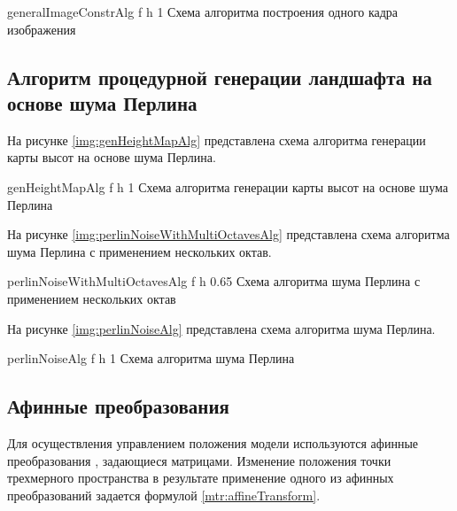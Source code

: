 {generalImageConstrAlg} %
{f} %
{h} %
{1\textwidth} %
{Схема алгоритма построения одного кадра изображения} %

\clearpage

\subsection{Алгоритм процедурной генерации ландшафта на основе шума Перлина}

На рисунке \ref{img:genHeightMapAlg} представлена схема алгоритма генерации карты высот на основе шума Перлина.

{genHeightMapAlg} %
{f} %
{h} %
{1\textwidth} %
{Схема алгоритма генерации карты высот на основе шума Перлина} %

\clearpage

На рисунке \ref{img:perlinNoiseWithMultiOctavesAlg} представлена схема алгоритма шума Перлина с применением нескольких октав.

{perlinNoiseWithMultiOctavesAlg} %
{f} %
{h} %
{0.65\textwidth} %
{Схема алгоритма шума Перлина с применением нескольких октав} %

\clearpage

На рисунке \ref{img:perlinNoiseAlg} представлена схема алгоритма шума Перлина.

{perlinNoiseAlg} %
{f} %
{h} %
{1\textwidth} %
{Схема алгоритма шума Перлина} %

\clearpage

\subsection{Афинные преобразования}

Для осуществления управлением положения модели используются афинные преобразования \cite{info_affineTransform}, задающиеся матрицами.
Изменение положения точки трехмерного пространства в результате применение одного из афинных преобразований задается формулой \ref{mtr:affineTransform}.

